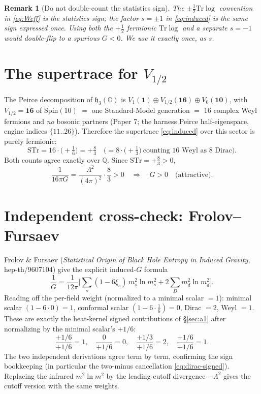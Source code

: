 \documentclass[11pt]{article}
\newtheorem{remark}{Remark}
\newcommand{\Tr}{\mathrm{Tr}}
\newcommand{\STr}{\mathrm{STr}}
\newcommand{\h}{\mathfrak{h}}
\newcommand{\Oo}{\mathbb{O}}
\newcommand{\QQ}{\mathbb{Q}}
\begin{document}
\begin{remark}[Do not double-count the statistics sign]\label{rem:double}
The $\pm\tfrac12\Tr\log$ convention in \eqref{eq:Weff} \emph{is} the statistics sign;
the factor $s=\pm1$ in \eqref{eq:induced} is the same sign expressed once. Using both
the $+\tfrac12$ fermionic $\Tr\log$ \emph{and} a separate $s=-1$ would double-flip to a
spurious $G<0$. We use it exactly once, as $s$.
\end{remark}

\section{The supertrace for $V_{1/2}$}\label{sec:str}

The Peirce decomposition of $\h_3(\Oo)$ is $V_1(\mathbf{1})\oplus
V_{1/2}(\mathbf{16})\oplus V_0(\mathbf{10})$, with $V_{1/2}=\mathbf{16}$ of $\mathrm{Spin}(10)$
$=$ one Standard-Model generation $=$ $16$ complex Weyl fermions and \emph{no} bosonic
partners (Paper 7; the harness Peirce half-eigenspace, engine indices $\{11..26\}$).
Therefore the supertrace \eqref{eq:induced} over this sector is purely fermionic:
\begin{equation}\label{eq:str}
\STr=16\cdot\Big(+\tfrac16\Big)=+\tfrac83
\quad\Big(=8\cdot\big(+\tfrac13\big)\ \text{counting $16$ Weyl as $8$ Dirac}\Big).
\end{equation}
Both counts agree exactly over $\QQ$. Since $\STr=+\tfrac83>0$,
\begin{equation}\label{eq:Gsign}
\frac{1}{16\pi G}=\frac{\Lambda^2}{(4\pi)^2}\cdot\frac83>0
\quad\Longrightarrow\quad G>0\quad\text{(attractive).}
\end{equation}

\section{Independent cross-check: Frolov--Fursaev}\label{sec:ff}

Frolov \& Fursaev (\emph{Statistical Origin of Black Hole Entropy in Induced Gravity},
hep-th/9607104) give the explicit induced-$G$ formula
\begin{equation}\label{eq:ff}
\frac1G=\frac{1}{12\pi}\Big[\sum_s(1-6\xi_s)\,m_s^2\ln m_s^2
   +2\sum_D m_d^2\ln m_d^2\Big].
\end{equation}
Reading off the per-field weight (normalized to a minimal scalar $=1$): minimal scalar
$(1-6\cdot0)=1$, conformal scalar $(1-6\cdot\tfrac16)=0$, Dirac $=2$, Weyl $=1$. These
are exactly the heat-kernel signed contributions of \S\ref{sec:a1} after normalizing by
the minimal scalar's $+1/6$:
\begin{equation}\label{eq:match}
\frac{+1/6}{+1/6}=1,\quad \frac{0}{+1/6}=0,\quad \frac{+1/3}{+1/6}=2,\quad
\frac{+1/6}{+1/6}=1.
\end{equation}
The two independent derivations agree term by term, confirming the sign bookkeeping
(in particular the two-minus cancellation \eqref{eq:dirac-signed}). Replacing the
infrared $m^2\ln m^2$ by the leading cutoff divergence $-\Lambda^2$ gives the cutoff
version with the same weights.
\end{document}
